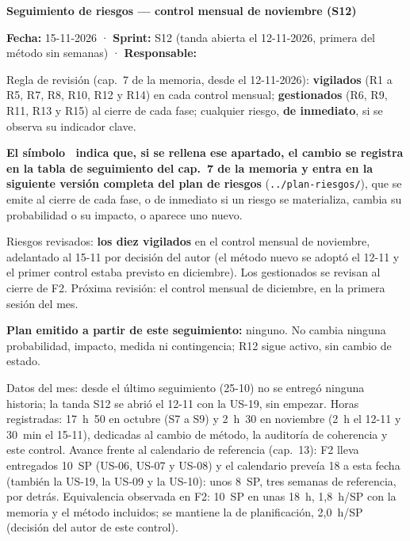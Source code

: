 \documentclass[11pt,a4paper]{article}
\begin{document}
\begin{center}
  {\LARGE\bfseries Seguimiento de riesgos — control mensual de noviembre (S12)}\\[6pt]
\end{center}

\textbf{Fecha:} 15-11-2026 · \textbf{Sprint:} S12 (tanda abierta el 12-11-2026, primera del método sin semanas) · \textbf{Responsable:} \thesisAuthor

Regla de revisión (cap.~7 de la memoria, desde el 12-11-2026): \textbf{vigilados} (R1 a R5, R7, R8, R10, R12 y R14) en cada control mensual; \textbf{gestionados} (R6, R9, R11, R13 y R15) al cierre de cada fase; cualquier riesgo, \textbf{de inmediato}, si se observa su indicador clave.

\textbf{El símbolo \updatesymbol\ indica que, si se rellena ese apartado, el cambio se registra en la tabla de seguimiento del cap.~7 de la memoria y entra en la siguiente versión completa del plan de riesgos} (\texttt{../plan-riesgos/}), que se emite al cierre de cada fase, o de inmediato si un riesgo se materializa, cambia su probabilidad o su impacto, o aparece uno nuevo.

Riesgos revisados:
\textbf{los diez vigilados} en el control mensual de noviembre, adelantado al 15-11 por decisión del autor (el método nuevo se adoptó el 12-11 y el primer control estaba previsto en diciembre).
Los gestionados se revisan al cierre de F2.
Próxima revisión: el control mensual de diciembre, en la primera sesión del mes.

\textbf{Plan emitido a partir de este seguimiento:} ninguno.
No cambia ninguna probabilidad, impacto, medida ni contingencia; R12 sigue activo, sin cambio de estado.

Datos del mes: desde el último seguimiento (25-10) no se entregó ninguna historia; la tanda S12 se abrió el 12-11 con la US-19, sin empezar.
Horas registradas: 17~h~50 en octubre (S7 a S9) y 2~h~30 en noviembre (2~h el 12-11 y 30~min el 15-11), dedicadas al cambio de método, la auditoría de coherencia y este control.
Avance frente al calendario de referencia (cap.~13): F2 lleva entregados 10~SP (US-06, US-07 y US-08) y el calendario preveía 18 a esta fecha (también la US-19, la US-09 y la US-10): unos 8~SP, tres semanas de referencia, por detrás.
Equivalencia observada en F2: 10~SP en unas 18~h, 1,8~h/SP con la memoria y el método incluidos; se mantiene la de planificación, 2,0~h/SP (decisión del autor de este control).

\bigline
\end{document}
